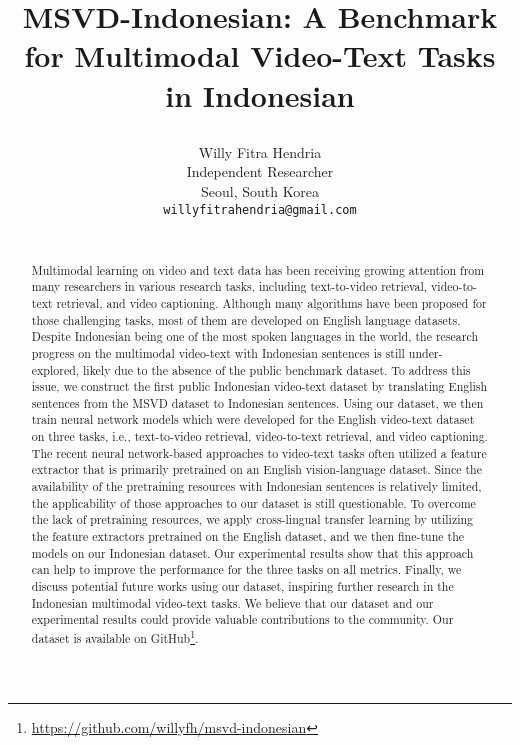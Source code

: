 \documentclass{article}
\title{MSVD-Indonesian: A Benchmark for Multimodal Video-Text Tasks in Indonesian              





}
\author{
  Willy Fitra Hendria \\
  Independent Researcher \\
  Seoul, South Korea\\
  \texttt{willyfitrahendria@gmail.com} \\
\\
}
\begin{document}
\maketitle

\begin{abstract}
Multimodal learning on video and text data has been receiving growing attention from many researchers in various research tasks, including text-to-video retrieval, video-to-text retrieval, and video captioning. Although many algorithms have been proposed for those challenging tasks, most of them are developed on English language datasets. Despite Indonesian being one of the most spoken languages in the world, the research progress on the multimodal video-text with Indonesian sentences is still under-explored, likely due to the absence of the public benchmark dataset. To address this issue, we construct the first public Indonesian video-text dataset by translating English sentences from the MSVD dataset to Indonesian sentences. Using our dataset, we then train neural network models which were developed for the English video-text dataset on three tasks, i.e., text-to-video retrieval, video-to-text retrieval, and video captioning. The recent neural network-based approaches to video-text tasks often utilized a feature extractor that is primarily pretrained on an English vision-language dataset. Since the availability of the pretraining resources with Indonesian sentences is relatively limited, the applicability of those approaches to our dataset is still questionable. To overcome the lack of pretraining resources, we apply cross-lingual transfer learning by utilizing the feature extractors pretrained on the English dataset, and we then fine-tune the models on our Indonesian dataset. Our experimental results show that this approach can help to improve the performance for the three tasks on all metrics. Finally, we discuss potential future works using our dataset, inspiring further research in the Indonesian multimodal video-text tasks. We believe that our dataset and our experimental results could provide valuable contributions to the community. Our dataset is available on GitHub\footnote{\label{fn:github}\href{https://github.com/willyfh/msvd-indonesian}{https://github.com/willyfh/msvd-indonesian}}.
\end{abstract}


\end{document}
